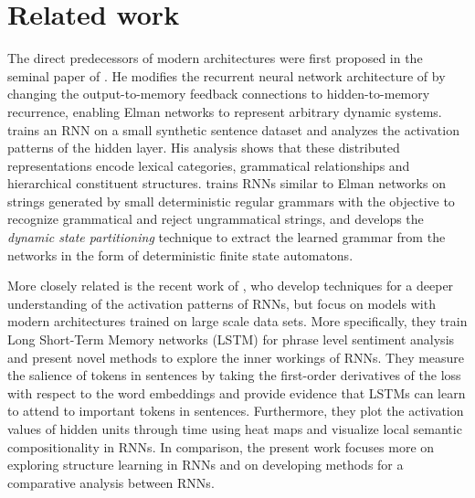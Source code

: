 \section{Related work}
\label{sec:related}

The direct predecessors of modern architectures were first proposed in the 
seminal paper of . He modifies the recurrent 
neural network architecture of  by changing the output-to-memory 
feedback connections to hidden-to-memory recurrence, enabling Elman networks to 
represent arbitrary dynamic systems.  trains an RNN on a small synthetic
sentence  dataset and analyzes the activation patterns of the hidden
layer. His analysis shows that these distributed representations  
encode lexical categories, grammatical relationships and hierarchical constituent 
structures.  trains RNNs similar to Elman
networks on strings generated by small 
deterministic regular grammars with the objective to recognize grammatical and reject ungrammatical 
strings, and develops the \emph{dynamic state partitioning} technique to extract the learned 
grammar from the networks in the form of deterministic finite state
automatons.

More closely related is the recent work of , who develop techniques 
for a deeper understanding of the activation patterns of RNNs, but focus on models with 
modern architectures trained on large scale data sets. More specifically, they train Long Short-Term Memory networks (LSTM) \cite{hochreiter1997long} 
for phrase level sentiment analysis 
and present novel methods 
to explore the inner workings of RNNs. They measure the salience of tokens
in sentences by taking the first-order derivatives of the loss with respect to the
word embeddings and provide evidence 
that LSTMs can learn to attend to important tokens in sentences. Furthermore,
they plot the activation values of hidden units through time using heat maps 
and visualize local semantic compositionality in RNNs. 
In comparison, the present work focuses more on exploring structure 
learning in RNNs and on developing methods for a comparative analysis between RNNs.

